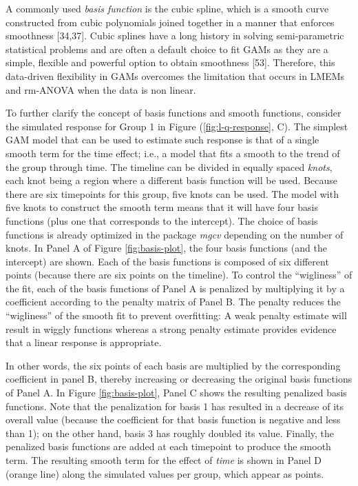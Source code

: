 \documentclass[
]{article}
\begin{document}
A commonly used \emph{basis function} is the cubic spline, which is a smooth curve constructed from cubic polynomials joined together in a manner that enforces smoothness {[}34,37{]}. Cubic splines have a long history in solving semi-parametric statistical problems and are often a default choice to fit GAMs as they are a simple, flexible and powerful option to obtain smoothness {[}53{]}. Therefore, this data-driven flexibility in GAMs overcomes the limitation that occurs in LMEMs and rm-ANOVA when the data is non linear.

To further clarify the concept of basis functions and smooth functions, consider the simulated response for Group 1 in Figure (\ref{fig:l-q-response}, C). The simplest GAM model that can be used to estimate such response is that of a single smooth term for the time effect; i.e., a model that fits a smooth to the trend of the group through time. The timeline can be divided in equally spaced \emph{knots}, each knot being a region where a different basis function will be used. Because there are six timepoints for this group, five knots can be used. The model with five knots to construct the smooth term means that it will have four basis functions (plus one that corresponds to the intercept). The choice of basis functions is already optimized in the package \emph{mgcv} depending on the number of knots. In Panel A of Figure \ref{fig:basis-plot}, the four basis functions (and the intercept) are shown. Each of the basis functions is composed of six different points (because there are six points on the timeline). To control the ``wigliness'' of the fit, each of the basis functions of Panel A is penalized by multiplying it by a coefficient according to the penalty matrix of Panel B. The penalty reduces the ``wigliness'' of the smooth fit to prevent overfitting: A weak penalty estimate will result in wiggly functions whereas a strong penalty estimate provides evidence that a linear response is appropriate.

In other words, the six points of each basis are multiplied by the corresponding coefficient in panel B, thereby increasing or decreasing the original basis functions of Panel A. In Figure \ref{fig:basis-plot}, Panel C shows the resulting penalized basis functions. Note that the penalization for basis 1 has resulted in a decrease of its overall value (because the coefficient for that basis function is negative and less than 1); on the other hand, basis 3 has roughly doubled its value. Finally, the penalized basis functions are added at each timepoint to produce the smooth term. The resulting smooth term for the effect of \emph{time} is shown in Panel D (orange line) along the simulated values per group, which appear as points.
\end{document}
